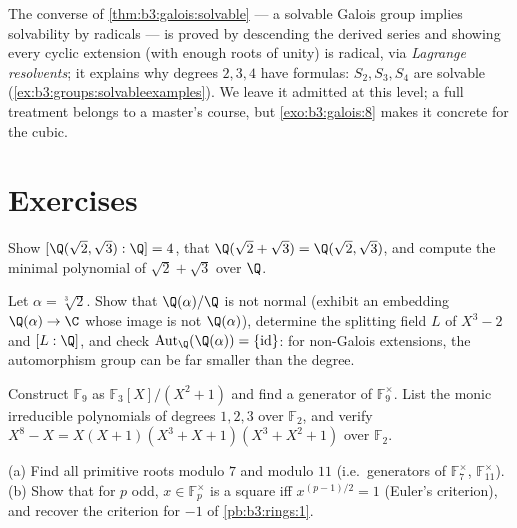 \begin{remark}\label{rem:b3:galois:converse}
The converse of \cref{thm:b3:galois:solvable} --- a solvable
Galois group implies solvability by radicals --- is proved by
descending the derived series and showing every cyclic extension
(with enough roots of unity) is radical, via \emph{Lagrange
resolvents}; it explains why degrees $2, 3, 4$ have formulas:
$S_2, S_3, S_4$ are solvable
(\cref{ex:b3:groups:solvableexamples}). We leave it admitted at
this level; a full treatment belongs to a master's course, but
\cref{exo:b3:galois:8} makes it concrete for the cubic.
\end{remark}

\section{Exercises}

\begin{exercise}[$\star$]\label{exo:b3:galois:1}
Show $[\Q(\sqrt2, \sqrt3):\Q] = 4$, that $\Q(\sqrt2 + \sqrt3) =
\Q(\sqrt2, \sqrt3)$, and compute the minimal polynomial of
$\sqrt2 + \sqrt3$ over $\Q$.
\end{exercise}

\begin{exercise}[$\star$]\label{exo:b3:galois:2}
Let $\alpha = \sqrt[3]2$. Show that $\Q(\alpha)/\Q$ is not
normal (exhibit an embedding $\Q(\alpha) \to \C$ whose image is
not $\Q(\alpha)$), determine the splitting field $L$ of $X^3 -
2$ and $[L:\Q]$, and check $\operatorname{Aut}_\Q(\Q(\alpha)) =
\{\mathrm{id}\}$: for non-Galois extensions, the automorphism
group can be far smaller than the degree.
\end{exercise}

\begin{exercise}[$\star$]\label{exo:b3:galois:3}
Construct $\mathbb F_9$ as $\mathbb F_3[X]/(X^2+1)$ and find a
generator of $\mathbb F_9^\times$. List the monic irreducible
polynomials of degrees $1, 2, 3$ over $\mathbb F_2$, and verify
$X^8 - X = X(X+1)(X^3+X+1)(X^3+X^2+1)$ over $\mathbb F_2$.
\end{exercise}

\begin{exercise}[$\star\star$]\label{exo:b3:galois:4}
(a) Find all primitive roots modulo $7$ and modulo $11$ (i.e.\
generators of $\mathbb F_7^\times$, $\mathbb F_{11}^\times$).
(b) Show that for $p$ odd, $x \in \mathbb F_p^\times$ is a
square iff $x^{(p-1)/2} = 1$ (Euler's criterion), and recover
the criterion for $-1$ of \cref{pb:b3:rings:1}.
\end{exercise}

